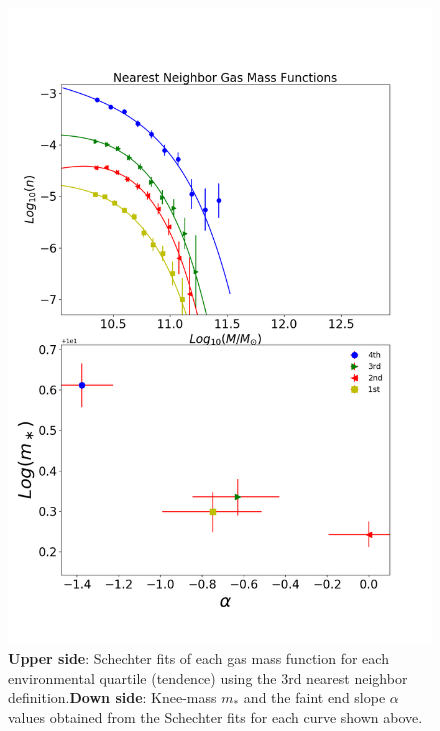 \documentclass[a4paper,fleqn,usenatbib]{mnras}
\begin{document}
\begin{figure}
	\includegraphics[width=\columnwidth]{./pics/F19_quartilesGas.png}
    \caption{\textbf{Upper side}: Schechter fits of each gas mass
      function for each environmental quartile (tendence) using the 3rd nearest
      neighbor definition.\textbf{Down side}: Knee-mass $m_\ast$ and
      the faint end slope $\alpha$ values obtained from the Schechter
      fits for each curve shown above.} 
    \label{fig:quartilesGas}
\end{figure}
\end{document}
